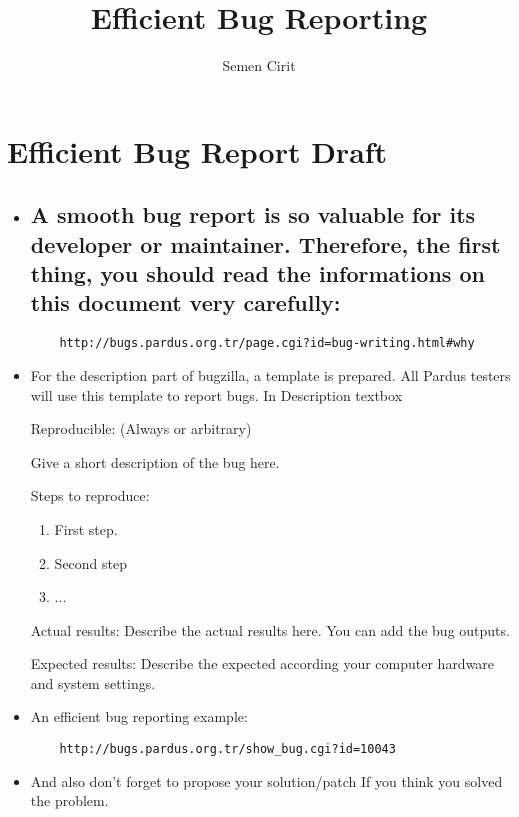 \documentclass[a4paper,10pt]{article}
\title{Efficient Bug Reporting}
\author{Semen Cirit}
\begin{document}
\maketitle

\section{Efficient Bug Report Draft}

\begin{itemize}
 
  	\item \subsection*{A smooth bug report is so valuable for its developer or maintainer. Therefore, the first thing, you should read the informations on this document very carefully:}
	\begin{verbatim} 
 	http://bugs.pardus.org.tr/page.cgi?id=bug-writing.html#why
	\end{verbatim}

  	\item For the description part of bugzilla, a template is prepared. All Pardus testers will use this template to report bugs.
  	In Description textbox

   	Reproducible: (Always or arbitrary)	
   
    	Give a short description of the bug here.
   
   	Steps to reproduce:
   	\begin{enumerate}
    	\item First step.
    	\item Second step
    	\item ...
   	\end{enumerate}

	Actual results:
	Describe the actual results here. You can add the bug outputs.
	
	Expected results:
	Describe the expected according your computer hardware and system settings.
	
	\item An efficient bug reporting example:
	\begin{verbatim}
	http://bugs.pardus.org.tr/show_bug.cgi?id=10043
	\end{verbatim}
	\item And also don't forget to propose your solution/patch If you think you solved the problem.


\end{itemize}
\end{document}
